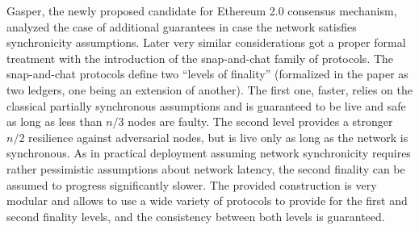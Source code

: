 \documentclass[12pt, fleqn]{article}
\begin{document}
Gasper\cite{BHKPQRSWZ18}, the newly proposed candidate for Ethereum 2.0 consensus mechanism, analyzed the case of additional guarantees in case the network satisfies synchronicity assumptions. Later very similar considerations got a proper formal treatment with the introduction of the snap-and-chat family of protocols\cite{NNT20}.
The snap-and-chat protocols define two ``levels of finality'' (formalized in the paper as two ledgers, one being an extension of another). The first one, faster, relies on the classical partially synchronous assumptions and is guaranteed to be live and safe as long as less than $n/3$ nodes are faulty. 
The second level provides a stronger $n/2$ resilience against adversarial nodes, but is live only as long as the network is synchronous.
As in practical deployment assuming network synchronicity requires rather pessimistic assumptions about network latency, the second finality can be assumed to progress significantly slower. 
The provided construction is very modular and allows to use a wide variety of protocols to provide for the first and second finality levels, and the consistency between both levels is guaranteed.
\end{document}
